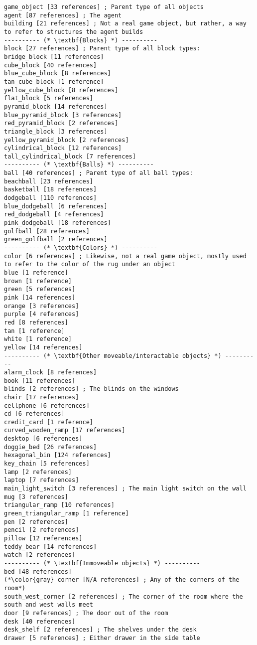 \documentclass{article}
\begin{document}
\begin{lstlisting}
game_object [33 references] ; Parent type of all objects
agent [87 references] ; The agent
building [21 references] ; Not a real game object, but rather, a way to refer to structures the agent builds
---------- (* \textbf{Blocks} *) ----------
block [27 references] ; Parent type of all block types:
bridge_block [11 references] 
cube_block [40 references] 
blue_cube_block [8 references] 
tan_cube_block [1 reference] 
yellow_cube_block [8 references] 
flat_block [5 references] 
pyramid_block [14 references] 
blue_pyramid_block [3 references] 
red_pyramid_block [2 references] 
triangle_block [3 references] 
yellow_pyramid_block [2 references] 
cylindrical_block [12 references] 
tall_cylindrical_block [7 references] 
---------- (* \textbf{Balls} *) ----------
ball [40 references] ; Parent type of all ball types:
beachball [23 references] 
basketball [18 references] 
dodgeball [110 references] 
blue_dodgeball [6 references] 
red_dodgeball [4 references] 
pink_dodgeball [18 references] 
golfball [28 references] 
green_golfball [2 references] 
---------- (* \textbf{Colors} *) ----------
color [6 references] ; Likewise, not a real game object, mostly used to refer to the color of the rug under an object
blue [1 reference] 
brown [1 reference] 
green [5 references] 
pink [14 references] 
orange [3 references] 
purple [4 references] 
red [8 references] 
tan [1 reference] 
white [1 reference] 
yellow [14 references] 
---------- (* \textbf{Other moveable/interactable objects} *) ----------
alarm_clock [8 references] 
book [11 references] 
blinds [2 references] ; The blinds on the windows
chair [17 references] 
cellphone [6 references] 
cd [6 references] 
credit_card [1 reference] 
curved_wooden_ramp [17 references] 
desktop [6 references] 
doggie_bed [26 references] 
hexagonal_bin [124 references] 
key_chain [5 references] 
lamp [2 references] 
laptop [7 references] 
main_light_switch [3 references] ; The main light switch on the wall
mug [3 references] 
triangular_ramp [10 references] 
green_triangular_ramp [1 reference] 
pen [2 references] 
pencil [2 references] 
pillow [12 references] 
teddy_bear [14 references] 
watch [2 references] 
---------- (* \textbf{Immoveable objects} *) ----------
bed [48 references] 
(*\color{gray} corner [N/A references] ; Any of the corners of the room*)
south_west_corner [2 references] ; The corner of the room where the south and west walls meet
door [9 references] ; The door out of the room
desk [40 references] 
desk_shelf [2 references] ; The shelves under the desk
drawer [5 references] ; Either drawer in the side table

\end{lstlisting}
\end{document}
